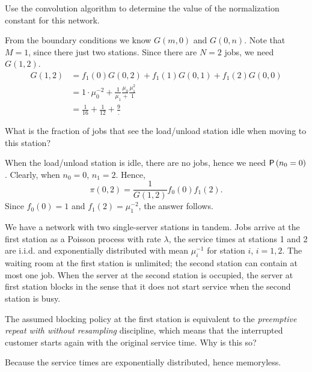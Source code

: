 \begin{exercise}[201704]
 Use the convolution algorithm to determine the value of the
 normalization constant for this network.
\begin{solution}
 From the boundary conditions we know $G(m, 0)$ and $G(0,n)$. Note
 that $M=1$, since there just two stations. Since there are $N=2$
 jobs, we need $G(1,2)$. 
 \begin{equation*}
 \begin{split}
 G(1,2) &= f_1(0) G(0, 2) + f_1(1) G(0, 1) + f_1(2) G(0,0) \\
 &= 1\cdot \mu_0^{-2} + \frac1{\mu_1} \frac{\mu_0} + \frac{\mu_1^2} 1 \\
 &= \frac 1{16} + \frac1{12} + \frac{9}.
 \end{split}
 \end{equation*}
\end{solution}
\end{exercise}

\begin{exercise}[201704]
 What is the fraction of jobs that see the load/unload station idle
 when moving to this station?
\begin{solution}
 When the load/unload station is idle, there are no jobs, hence we need
 $\P{n_0=0}$. Clearly, when $n_0=0$, $n_1 = 2$. Hence,
 \begin{equation*}
\pi(0, 2) = \frac1{G(1,2)} f_0(0) f_1(2).
 \end{equation*}
Since $f_0(0) = 1$ and $f_1(2) = \mu_1^{-2}$, the answer follows.
\end{solution}
\end{exercise}

We have a network with two single-server stations in tandem. Jobs
arrive at the first station as a Poisson process with rate $\lambda$,
the service times at stations 1 and 2 are i.i.d. and exponentially
distributed with mean $\mu_i^{-1}$ for station $i$, $i=1,2$. The waiting room at the first station is unlimited; the second station can contain at most one job. When the server at the second station is occupied, the server at first station blocks in the sense that it does not start service when the second station is busy. 

\begin{exercise}[201706]
 The assumed blocking policy at the first station is equivalent to the \emph{preemptive repeat with without resampling} discipline, which means that the interrupted customer starts again with the original service time. Why is this so? 
\begin{solution}
 Because the service times are exponentially distributed, hence memoryless. 
\end{solution}
\end{exercise}

